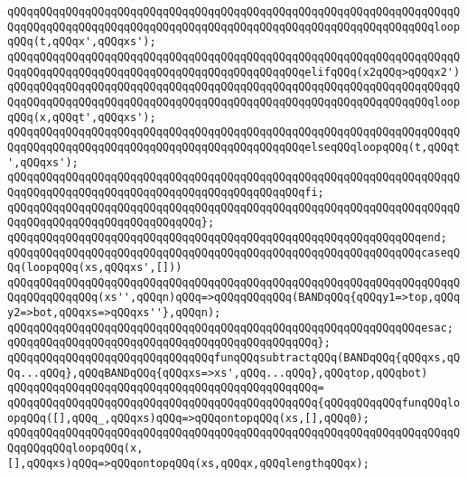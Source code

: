 \verb|qQQqqQQqqQQqqQQqqQQqqQQqqQQqqQQqqQQqqQQqqQQqqQQqqQQqqQQqqQQqqQQqqQQqqQQqqQQqqQQqqQQqqQQqqQQqqQQqqQQqqQQqqQQqqQQqqQQqqQQqqQQqqQQqqQQqqQQqloopqQQq(t,qQQqx',qQQqxs');|\newline
\verb|qQQqqQQqqQQqqQQqqQQqqQQqqQQqqQQqqQQqqQQqqQQqqQQqqQQqqQQqqQQqqQQqqQQqqQQqqQQqqQQqqQQqqQQqqQQqqQQqqQQqqQQqqQQqqQQqqQQqelifqQQq(x2qQQq>qQQqx2')|\newline
\verb|qQQqqQQqqQQqqQQqqQQqqQQqqQQqqQQqqQQqqQQqqQQqqQQqqQQqqQQqqQQqqQQqqQQqqQQqqQQqqQQqqQQqqQQqqQQqqQQqqQQqqQQqqQQqqQQqqQQqqQQqqQQqqQQqqQQqqQQqloopqQQq(x,qQQqt',qQQqxs');|\newline
\verb|qQQqqQQqqQQqqQQqqQQqqQQqqQQqqQQqqQQqqQQqqQQqqQQqqQQqqQQqqQQqqQQqqQQqqQQqqQQqqQQqqQQqqQQqqQQqqQQqqQQqqQQqqQQqqQQqqQQqelseqQQqloopqQQq(t,qQQqt',qQQqxs');|\newline
\verb|qQQqqQQqqQQqqQQqqQQqqQQqqQQqqQQqqQQqqQQqqQQqqQQqqQQqqQQqqQQqqQQqqQQqqQQqqQQqqQQqqQQqqQQqqQQqqQQqqQQqqQQqqQQqqQQqqQQqfi;|\newline
\verb|qQQqqQQqqQQqqQQqqQQqqQQqqQQqqQQqqQQqqQQqqQQqqQQqqQQqqQQqqQQqqQQqqQQqqQQqqQQqqQQqqQQqqQQqqQQqqQQqqQQq};|\newline
\verb|qQQqqQQqqQQqqQQqqQQqqQQqqQQqqQQqqQQqqQQqqQQqqQQqqQQqqQQqqQQqqQQqend;|\newline
\newline
\verb|qQQqqQQqqQQqqQQqqQQqqQQqqQQqqQQqqQQqqQQqqQQqqQQqqQQqqQQqqQQqqQQqcaseqQQq(loopqQQq(xs,qQQqxs',[]))|\newline
\newline
\verb|qQQqqQQqqQQqqQQqqQQqqQQqqQQqqQQqqQQqqQQqqQQqqQQqqQQqqQQqqQQqqQQqqQQqqQQqqQQqqQQqqQQq(xs'',qQQqn)qQQq=>qQQqqQQqqQQq(BANDqQQq{qQQqy1=>top,qQQqy2=>bot,qQQqxs=>qQQqxs''},qQQqn);|\newline
\verb|qQQqqQQqqQQqqQQqqQQqqQQqqQQqqQQqqQQqqQQqqQQqqQQqqQQqqQQqqQQqqQQqesac;|\newline
\verb|qQQqqQQqqQQqqQQqqQQqqQQqqQQqqQQqqQQqqQQqqQQqqQQq};|\newline
\newline
\verb|qQQqqQQqqQQqqQQqqQQqqQQqqQQqqQQqfunqQQqsubtractqQQq(BANDqQQq{qQQqxs,qQQq...qQQq},qQQqBANDqQQq{qQQqxs=>xs',qQQq...qQQq},qQQqtop,qQQqbot)|\newline
\verb|qQQqqQQqqQQqqQQqqQQqqQQqqQQqqQQqqQQqqQQqqQQqqQQq=|\newline
\verb|qQQqqQQqqQQqqQQqqQQqqQQqqQQqqQQqqQQqqQQqqQQqqQQq{qQQqqQQqqQQqfunqQQqloopqQQq([],qQQq_,qQQqxs)qQQq=>qQQqontopqQQq(xs,[],qQQq0);|\newline
\verb|qQQqqQQqqQQqqQQqqQQqqQQqqQQqqQQqqQQqqQQqqQQqqQQqqQQqqQQqqQQqqQQqqQQqqQQqqQQqqQQqloopqQQq(x,[],qQQqxs)qQQq=>qQQqontopqQQq(xs,qQQqx,qQQqlengthqQQqx);|\newline

